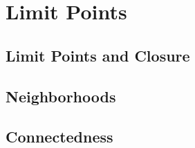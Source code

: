 \chapter{Limit Points}

\section{Limit Points and Closure}



\section{Neighborhoods}



\section{Connectedness}



